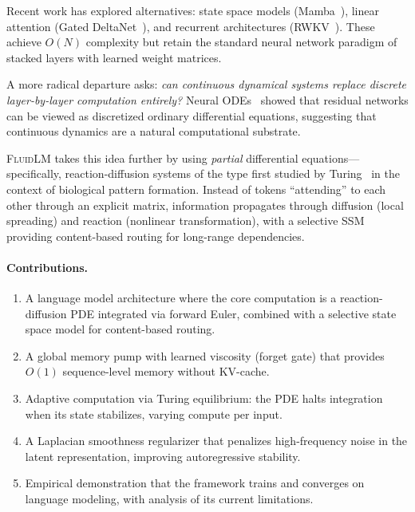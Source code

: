 \documentclass{article}
\newcommand{\fluidlm}{\textsc{FluidLM}}
\begin{document}
Recent work has explored alternatives: state space models (Mamba~\cite{gu2023mamba}), linear attention (Gated DeltaNet~\cite{yang2024gated}), and recurrent architectures (RWKV~\cite{peng2023rwkv}). These achieve $O(N)$ complexity but retain the standard neural network paradigm of stacked layers with learned weight matrices.

A more radical departure asks: \emph{can continuous dynamical systems replace discrete layer-by-layer computation entirely?} Neural ODEs~\cite{chen2018neural} showed that residual networks can be viewed as discretized ordinary differential equations, suggesting that continuous dynamics are a natural computational substrate.

\fluidlm{} takes this idea further by using \emph{partial} differential equations---specifically, reaction-diffusion systems of the type first studied by Turing~\cite{turing1952chemical} in the context of biological pattern formation. Instead of tokens ``attending'' to each other through an explicit matrix, information propagates through diffusion (local spreading) and reaction (nonlinear transformation), with a selective SSM providing content-based routing for long-range dependencies.

\paragraph{Contributions.}
\begin{enumerate}
    \item A language model architecture where the core computation is a reaction-diffusion PDE integrated via forward Euler, combined with a selective state space model for content-based routing.
    \item A global memory pump with learned viscosity (forget gate) that provides $O(1)$ sequence-level memory without KV-cache.
    \item Adaptive computation via Turing equilibrium: the PDE halts integration when its state stabilizes, varying compute per input.
    \item A Laplacian smoothness regularizer that penalizes high-frequency noise in the latent representation, improving autoregressive stability.
    \item Empirical demonstration that the framework trains and converges on language modeling, with analysis of its current limitations.
\end{enumerate}

\end{document}
